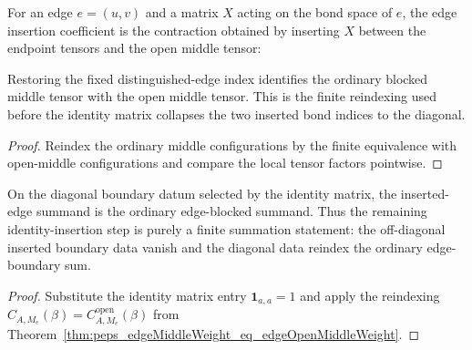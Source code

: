 \begin{definition}%
    \label{def:peps_edgeInsertedCoeff}
    \leanok
    For an edge $e=(u,v)$ and a matrix $X$ acting on the bond space of $e$,
    the edge insertion coefficient is the contraction obtained by inserting
    $X$ between the endpoint tensors and the open middle tensor:
    \begin{center}
        \TNPEPSEdgeInsertedCoeff
    \end{center}
\end{definition}

\begin{theorem}%
    \label{thm:peps_edgeMiddleWeight_eq_edgeOpenMiddleWeight}
    \leanok
    Restoring the fixed distinguished-edge index identifies the ordinary blocked
    middle tensor with the open middle tensor. This is the finite reindexing
    used before the identity matrix collapses the two inserted bond indices to
    the diagonal.
\end{theorem}
\begin{proof}\leanok
    Reindex the ordinary middle configurations by the finite equivalence with
    open-middle configurations and compare the local tensor factors pointwise.
\end{proof}

\begin{theorem}%
    \label{thm:peps_edgeInsertedCoeff_identity_diagonal_summand}
    \leanok
    On the diagonal boundary datum selected by the identity matrix, the
    inserted-edge summand is the ordinary edge-blocked summand. Thus the
    remaining identity-insertion step is purely a finite summation statement:
    the off-diagonal inserted boundary data vanish and the diagonal data reindex
    the ordinary edge-boundary sum.
\end{theorem}
\begin{proof}\leanok
    Substitute the identity matrix entry $\mathbf{1}_{a,a}=1$ and apply the
    reindexing
    \(C_{A,M_e}(\beta)=C^{\mathrm{open}}_{A,M_e}(\beta)\)
    from Theorem~\ref{thm:peps_edgeMiddleWeight_eq_edgeOpenMiddleWeight}.
\end{proof}

